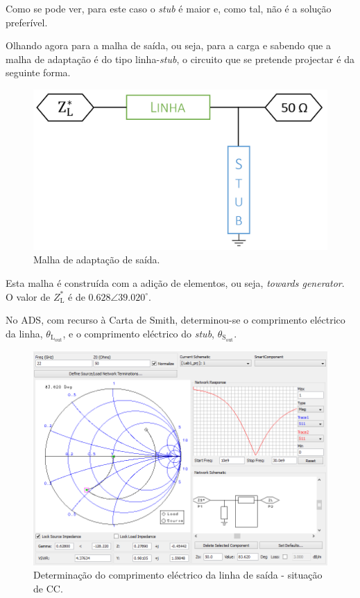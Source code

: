 \documentclass[11pt]{article}
\numberwithin{equation}{section}
\begin{document}
Como se pode ver, para este caso o \textit{stub} é maior e, como tal, não é a solução preferível.

Olhando agora para a malha de saída, ou seja, para a carga e sabendo que a malha de adaptação é do tipo linha-\textit{stub}, o circuito que se pretende projectar é da seguinte forma.

\begin{figure}[H]
	\centering
	\includegraphics[keepaspectratio=true, scale=0.25]{teoricas/malhasaida}
	\vspace{-0.5em}
	\caption{Malha de adaptação de saída.}
	\vspace{-0.8em}
\end{figure}

Esta malha é construída com a adição de elementos, ou seja, \textit{towards generator}. O valor de $Z_{\text{L}}^{*}$ é de $0.628\angle39.020 ^{\circ}$.

No ADS, com recurso à Carta de Smith, determinou-se o comprimento eléctrico da linha, $\theta_{\text{L}_{\text{out}}}$, e o comprimento eléctrico do \textit{stub}, $\theta_{\text{S}_{\text{out}}}$. 

\begin{figure}[H]
	\centering
	\includegraphics[keepaspectratio=true, scale=0.45]{exps/Carga_CC_line}
	\vspace{-0.5em}
	\caption{Determinação do comprimento eléctrico da linha de saída - situação de CC.}
	\vspace{-0.8em}
\end{figure}
\end{document}
